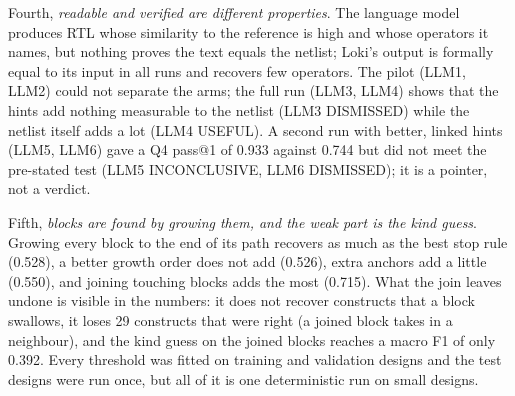 \documentclass[conference]{IEEEtran}
\begin{document}
Fourth, \emph{readable and verified are different properties}. The language model produces RTL whose
similarity to the reference is high and whose operators it names, but nothing proves the text equals the
netlist; Loki's output is formally equal to its input in all runs and recovers few operators. The pilot
(LLM1, LLM2) could not separate the arms; the full run (LLM3, LLM4) shows that the hints add nothing
measurable to the netlist (LLM3 DISMISSED) while the netlist itself adds a lot (LLM4 USEFUL). A second run with better, linked hints (LLM5, LLM6) gave a Q4 pass@1 of 0.933 against 0.744 but did not meet
the pre-stated test (LLM5 INCONCLUSIVE, LLM6 DISMISSED); it is a pointer, not a verdict.


Fifth, \emph{blocks are found by growing them, and the weak part is the kind guess}. Growing every
block to the end of its path recovers as much as the best stop rule (0.528), a better growth order
does not add (0.526), extra anchors add a little (0.550), and joining touching blocks adds the most
(0.715). What the join leaves undone is visible in the numbers: it does not recover constructs
that a block swallows, it loses 29 constructs that were right (a joined block takes in a
neighbour), and the kind guess on the joined blocks reaches a macro F1 of only 0.392. Every
threshold was fitted on training and validation designs and the test designs were run once, but
all of it is one deterministic run on small designs.
\end{document}
